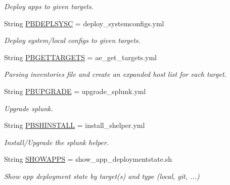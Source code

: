 \begin{DoxyCompactItemize}
\begin{DoxyCompactList}\small\item\em Deploy apps to given targets. \end{DoxyCompactList}\item 
\mbox{\label{ansible__engine_8sh_a4f304baa81ee66cb0098e1a9973d7145}} 
String \mbox{\hyperlink{ansible__engine_8sh_a4f304baa81ee66cb0098e1a9973d7145}{P\+B\+D\+E\+P\+L\+S\+Y\+SC}} = deploy\+\_\+systemconfigs.\+yml
\begin{DoxyCompactList}\small\item\em Deploy system/local configs to given targets. \end{DoxyCompactList}\item 
\mbox{\label{ansible__engine_8sh_a55bcb5c8a394dd5d538f5f406af77df8}} 
String \mbox{\hyperlink{ansible__engine_8sh_a55bcb5c8a394dd5d538f5f406af77df8}{P\+B\+G\+E\+T\+T\+A\+R\+G\+E\+TS}} = ae\+\_\+get\+\_\+targets.\+yml
\begin{DoxyCompactList}\small\item\em Parsing inventories file and create an expanded host list for each target. \end{DoxyCompactList}\item 
\mbox{\label{ansible__engine_8sh_a40bf4e7ce006ccfc3a6cb8aa66e088df}} 
String \mbox{\hyperlink{ansible__engine_8sh_a40bf4e7ce006ccfc3a6cb8aa66e088df}{P\+B\+U\+P\+G\+R\+A\+DE}} = upgrade\+\_\+splunk.\+yml
\begin{DoxyCompactList}\small\item\em Upgrade splunk. \end{DoxyCompactList}\item 
String \mbox{\hyperlink{ansible__engine_8sh_a63fb318d1ba289777a689f021cfb4434}{P\+B\+S\+H\+I\+N\+S\+T\+A\+LL}} = install\+\_\+shelper.\+yml
\begin{DoxyCompactList}\small\item\em Install/\+Upgrade the splunk helper. \end{DoxyCompactList}\item 
\mbox{\label{ansible__engine_8sh_aa8b6c14970a3d4f412f9e6cca56ca23f}} 
String \mbox{\hyperlink{ansible__engine_8sh_aa8b6c14970a3d4f412f9e6cca56ca23f}{S\+H\+O\+W\+A\+P\+PS}} = show\+\_\+app\+\_\+deploymentstate.\+sh
\begin{DoxyCompactList}\small\item\em Show app deployment state by target(s) and type (local, git, ...) \end{DoxyCompactList}\item 

\end{DoxyCompactItemize}
